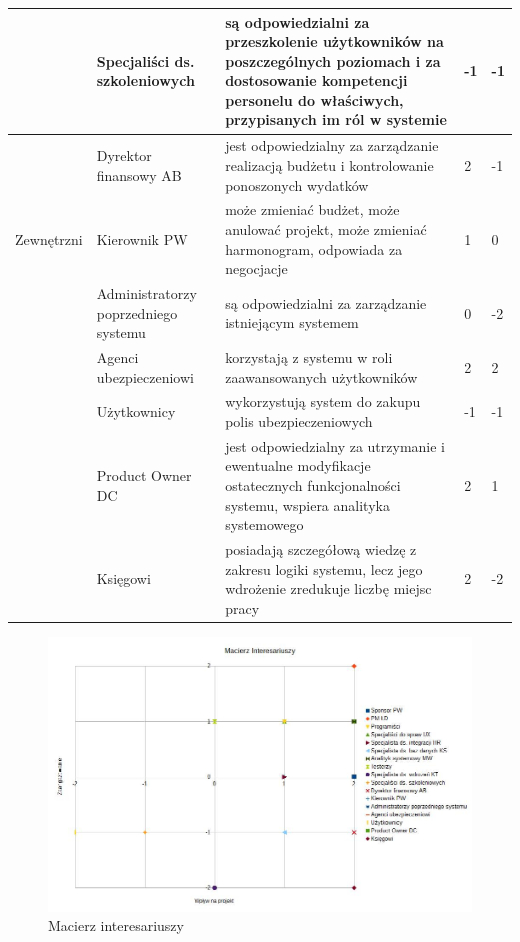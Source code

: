 \documentclass{article}
\begin{document}
\begin{longtable}{|l|L{0.2\textwidth}|L{0.58\textwidth}|C{0.15\textwidth}|C{0.15\textwidth}|}
 & Specjaliści ds. szkoleniowych & są odpowiedzialni za przeszkolenie użytkowników na poszczególnych poziomach i za dostosowanie kompetencji personelu do właściwych, przypisanych im ról w systemie & -1 & -1 \\ \hline
 & Dyrektor finansowy AB & jest odpowiedzialny za zarządzanie realizacją budżetu i kontrolowanie ponoszonych wydatków & 2 & -1 \\ \hline
Zewnętrzni & Kierownik PW & może zmieniać budżet, może anulować projekt, może zmieniać harmonogram, odpowiada za negocjacje & 1 & 0 \\ \hline
 & Administratorzy poprzedniego systemu & są odpowiedzialni za zarządzanie istniejącym systemem & 0 & -2 \\ \hline
 & Agenci ubezpieczeniowi & korzystają z systemu w roli zaawansowanych użytkowników & 2 & 2 \\ \hline
 & Użytkownicy & wykorzystują system do zakupu polis ubezpieczeniowych & -1 & -1 \\ \hline
 & Product Owner DC & jest odpowiedzialny za utrzymanie i ewentualne modyfikacje ostatecznych funkcjonalności systemu, wspiera analityka systemowego & 2 & 1 \\ \hline
 & Księgowi & posiadają szczegółową wiedzę z zakresu logiki systemu, lecz jego wdrożenie zredukuje liczbę miejsc pracy & 2 & -2 \\ \hline
\end{longtable}

\begin{figure}[h]
    \centering
    \includegraphics[scale=0.4]{macierz_interesariuszy.png}
    \caption{Macierz interesariuszy}
\end{figure}
\end{document}
